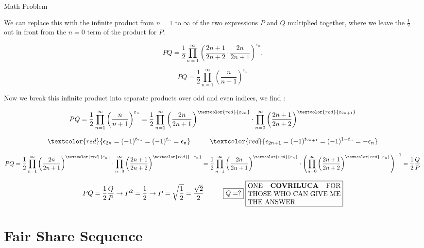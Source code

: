 \documentclass{beamer}
\begin{document}
\begin{frame}{Math Problem}
    \scriptsize
    
    We can replace this with the infinite product from $n=1$ to $\infty$ of the two expressions $P$ and $Q$ multiplied together, where we leave the $\frac{1}{2}$ out in front from the $n=0$ term of the product for $P$. 
    
    \[
        PQ = \frac{1}{2} \prod_{n=1}^\infty \left(\frac{2n+1}{2n+2} \cdot \frac{2n}{2n+1}\right)^{\varepsilon_n}.
    \]
    
    \[
        PQ = \frac{1}{2} \prod_{n=1}^\infty \left(\frac{n}{n+1}\right)^{\varepsilon_n}
    \]

    Now we break this infinite product into separate products over odd
    and even indices, we find :


    \[
        PQ = \frac{1}{2} \prod_{n=1}^\infty \left(\frac{n}{n+1}\right)^{\varepsilon_n} = \frac{1}{2} \prod_{n=1}^\infty \left(\frac{2n}{2n+1}\right)^{\textcolor{red}{\varepsilon_{2n}}} \cdot \prod_{n=0}^\infty \left(\frac{2n+1}{2n+2}\right)^{\textcolor{red}{\varepsilon_{2n+1}}}
    \]

    \[
        \textcolor{red}{\epsilon_{2n} = (-1)^{t_{2n}} = (-1)^{t_n} = \epsilon_n} 
        \hspace{1cm} 
        \textcolor{red}{\epsilon_{2n+1} = (-1)^{t_{2n+1}} = (-1)^{1-t_n} = -\epsilon_n}
    \]

    \[
        PQ = \frac{1}{2} \prod_{n=1}^\infty \left(\frac{2n}{2n+1}\right)^{\textcolor{red}{\varepsilon_{n}}} \cdot \prod_{n=0}^\infty \left(\frac{2n+1}{2n+2}\right)^{\textcolor{red}{-\varepsilon_{n}}} = \frac{1}{2} \prod_{n=1}^\infty \left(\frac{2n}{2n+1}\right)^{\textcolor{red}{\varepsilon_{n}}} \cdot \left(\prod_{n=0}^\infty \left(\frac{2n+1}{2n+2}\right)^{\textcolor{red}{\varepsilon_{n}}}\right)^{-1} = \frac{1}{2} \frac{Q}{P}
    \]

    \[
        PQ = \frac{1}{2} \frac{Q}{P} \rightarrow P^2 = \frac{1}{2} \rightarrow P = \sqrt{\frac{1}{2}} = \frac{\sqrt{2}}{2} 
        \hspace{1cm} 
        \boxed{Q = ?} \hspace{0.1cm} \boxed{\parbox{4.8cm}{ONE \textbf{COVRILUCA} FOR THOSE WHO CAN GIVE ME THE ANSWER}}
    \]
    
\end{frame}


\section{Fair Share Sequence}
\end{document}
